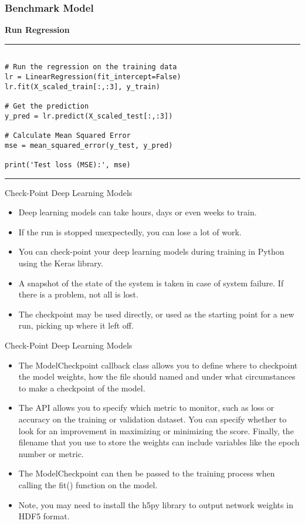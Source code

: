 \documentclass[11pt]{beamer}
\begin{document}
\begin{frame}[fragile]
\frametitle{Benchmark Model}
\textbf{Run Regression}
\rule{\textwidth}{1pt}
\scriptsize
\begin{verbatim}

# Run the regression on the training data
lr = LinearRegression(fit_intercept=False)
lr.fit(X_scaled_train[:,:3], y_train)

# Get the prediction
y_pred = lr.predict(X_scaled_test[:,:3])

# Calculate Mean Squared Error
mse = mean_squared_error(y_test, y_pred)

print('Test loss (MSE):', mse)

\end{verbatim}
\rule{\textwidth}{1pt}
\end{frame}
\begin{frame}{Check-Point Deep Learning Models}
\begin{itemize}
\item Deep learning models can take hours, days or even weeks to train.
\item If the run is stopped unexpectedly, you can lose a lot of work.
\item You can check-point your deep learning models during training in Python using the Keras library.
\item A snapshot of the state of the system is taken in case of system failure. If there is a problem, not all is lost. 
\item The checkpoint may be used directly, or used as the starting point for a new run, picking up where it left off.
\end{itemize}
\end{frame}
\begin{frame}{Check-Point Deep Learning Models}
\begin{itemize}
\item The ModelCheckpoint callback class allows you to define where to checkpoint the model weights, how the file should named and under what circumstances to make a checkpoint of the model.

\item The API allows you to specify which metric to monitor, such as loss or accuracy on the training or validation dataset. You can specify whether to look for an improvement in maximizing or minimizing the score. Finally, the filename that you use to store the weights can include variables like the epoch number or metric.

\item The ModelCheckpoint can then be passed to the training process when calling the fit() function on the model.

\item Note, you may need to install the h5py library to output network weights in HDF5 format.
\end{itemize}
\end{frame}
\end{document}
